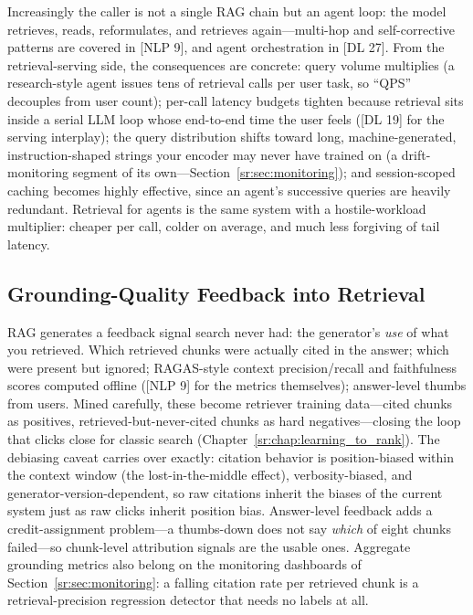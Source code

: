 Increasingly the caller is not a single RAG chain but an agent loop: the model retrieves, reads, reformulates, and retrieves again---multi-hop and self-corrective patterns are covered in [NLP 9], and agent orchestration in [DL 27]. From the retrieval-serving side, the consequences are concrete: query volume multiplies (a research-style agent issues tens of retrieval calls per user task, so ``QPS'' decouples from user count); per-call latency budgets tighten because retrieval sits inside a serial LLM loop whose end-to-end time the user feels ([DL 19] for the serving interplay); the query distribution shifts toward long, machine-generated, instruction-shaped strings your encoder may never have trained on (a drift-monitoring segment of its own---Section~\ref{sr:sec:monitoring}); and session-scoped caching becomes highly effective, since an agent's successive queries are heavily redundant. Retrieval for agents is the same system with a hostile-workload multiplier: cheaper per call, colder on average, and much less forgiving of tail latency.

\subsection{Grounding-Quality Feedback into Retrieval}

RAG generates a feedback signal search never had: the generator's \textit{use} of what you retrieved. Which retrieved chunks were actually cited in the answer; which were present but ignored; RAGAS-style context precision/recall and faithfulness scores computed offline ([NLP 9] for the metrics themselves); answer-level thumbs from users. Mined carefully, these become retriever training data---cited chunks as positives, retrieved-but-never-cited chunks as hard negatives---closing the loop that clicks close for classic search (Chapter~\ref{sr:chap:learning_to_rank}). The debiasing caveat carries over exactly: citation behavior is position-biased within the context window (the lost-in-the-middle effect), verbosity-biased, and generator-version-dependent, so raw citations inherit the biases of the current system just as raw clicks inherit position bias. Answer-level feedback adds a credit-assignment problem---a thumbs-down does not say \textit{which} of eight chunks failed---so chunk-level attribution signals are the usable ones. Aggregate grounding metrics also belong on the monitoring dashboards of Section~\ref{sr:sec:monitoring}: a falling citation rate per retrieved chunk is a retrieval-precision regression detector that needs no labels at all.

